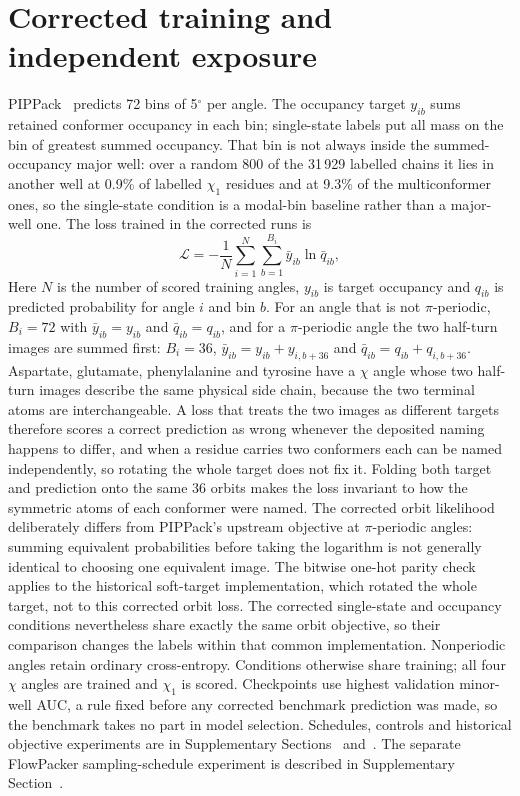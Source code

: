 \documentclass[10pt,twocolumn,a4paper]{article}
\begin{document}
\section{Corrected training and independent exposure}\label{app:training}


PIPPack~\citep{randolph2024pippack} predicts 72 bins of 5$^\circ$ per angle. The occupancy
target $y_{ib}$ sums retained conformer occupancy in each bin; single-state labels
put all mass on the bin of greatest summed occupancy. That bin is not always inside the
summed-occupancy major well: over a random 800 of the 31\,929 labelled chains it lies in
another well at 0.9\% of labelled $\chi_1$ residues and at 9.3\% of the multiconformer
ones, so the single-state condition is a modal-bin baseline rather than a major-well one. The loss trained in the corrected runs is
\begin{equation}
\mathcal L=-\frac 1N\sum_{i=1}^{N}\sum_{b=1}^{B_i}\bar y_{ib}\ln \bar q_{ib},
\label{eq:loss}
\end{equation}
Here $N$ is the number of scored training angles, $y_{ib}$ is target occupancy and $q_{ib}$ is predicted probability for angle $i$ and bin $b$. For an angle that is not $\pi$-periodic, $B_i=72$ with $\bar y_{ib}=y_{ib}$ and
$\bar q_{ib}=q_{ib}$, and for a $\pi$-periodic angle the two half-turn images are summed
first: $B_i=36$, $\bar y_{ib}=y_{ib}+y_{i,b+36}$ and $\bar q_{ib}=q_{ib}+q_{i,b+36}$.
Aspartate, glutamate, phenylalanine and tyrosine have a $\chi$ angle whose two half-turn
images describe the same physical side chain, because the two terminal atoms are
interchangeable. A loss that treats the two images as different targets therefore scores a
correct prediction as wrong whenever the deposited naming happens to differ, and when a
residue carries two conformers each can be named independently, so rotating the whole
target does not fix it. Folding both target and prediction onto the same 36 orbits makes
the loss invariant to how the symmetric atoms of each conformer were named. The
corrected orbit likelihood deliberately differs from PIPPack's upstream objective
at $\pi$-periodic angles: summing equivalent probabilities before taking the
logarithm is not generally identical to choosing one equivalent image. The bitwise
one-hot parity check applies to the historical soft-target implementation, which
rotated the whole target, not to this corrected orbit loss. The corrected single-state
and occupancy conditions nevertheless share exactly the same orbit objective, so
their comparison changes the labels within that common implementation. Nonperiodic
angles retain ordinary cross-entropy. Conditions otherwise share training; all four $\chi$
angles are trained and $\chi_1$ is scored. Checkpoints use highest validation minor-well
AUC, a rule fixed before any corrected benchmark prediction was made, so the benchmark
takes no part in model selection. Schedules, controls and historical objective experiments
are in Supplementary Sections~ and~. The separate FlowPacker sampling-schedule
experiment is described in Supplementary Section~.
\end{document}
